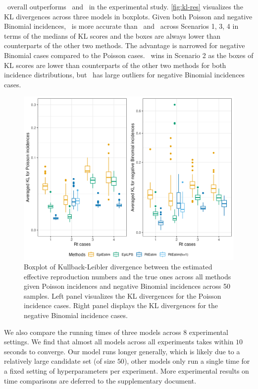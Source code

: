 \RtEstim\ overall outperforms \EpiEstim\ and \EpiLPS\ in the experimental study. \autoref{fig:kl-res} visualizes the KL divergences across three models in boxplots. Given both Poisson and negative Binomial incidences, \RtEstim\ is more accurate than \EpiEstim\ and \EpiLPS\ across Scenarios 1, 3, 4 in terms of the medians of KL scores and the boxes are always lower than counterparts of the other two methods. The advantage is narrowed for negative Binomial cases compared to the Poisson cases. \EpiLPS\ wins in Scenario 2 as the boxes of KL scores are lower than counterparts of the other two methods for both incidence distributions, but \EpiLPS\ has large outliers for negative Binomial incidences cases. 
\begin{figure}[htb]
    \centering
    \includegraphics*[width=160mm]{fig/kl.png}
    \caption{Boxplot of Kullback-Leibler divergence between the estimated effective reproduction numbers and the true ones across all methods given Poisson incidences and negative Binomial incidences across 50 samples. Left panel visualizes the KL divergences for the Poisson incidence cases. Right panel displays the KL divergences for the negative Binomial incidence cases.}%
    \label{fig:kl-res}
\end{figure}

We also compare the running times of three models across $8$ experimental settings. We find that almost all models across all experiments takes within $10$ seconds to converge. Our model runs longer generally, which is likely due to a relatively large candidate set (of size $50$), other models only run a single time for a fixed setting of hyperparameters per experiment. 
More experimental results on time comparisons are deferred to the supplementary document. 


